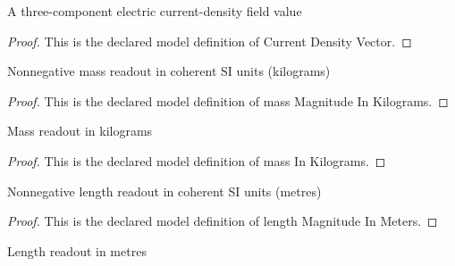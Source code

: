 \begin{definition}
  \label{def:physics:phyx-mini-0627:phyxminiproblems-problemphyxmini0627-currentdensityvector}
  A three-component electric current-density field value
\end{definition}
\begin{proof}
  This is the declared model definition of Current Density Vector.
\end{proof}
\begin{definition}
  \label{def:physics:phyx-mini-0627:phyxminiproblems-problemphyxmini0627-massmagnitudeinkilograms}
  Nonnegative mass readout in coherent SI units (kilograms)
\end{definition}
\begin{proof}
  This is the declared model definition of mass Magnitude In Kilograms.
\end{proof}
\begin{definition}
  \label{def:physics:phyx-mini-0627:phyxminiproblems-problemphyxmini0627-massinkilograms}
  Mass readout in kilograms
\end{definition}
\begin{proof}
  This is the declared model definition of mass In Kilograms.
\end{proof}
\begin{definition}
  \label{def:physics:phyx-mini-0627:phyxminiproblems-problemphyxmini0627-lengthmagnitudeinmeters}
  Nonnegative length readout in coherent SI units (metres)
\end{definition}
\begin{proof}
  This is the declared model definition of length Magnitude In Meters.
\end{proof}
\begin{definition}
  \label{def:physics:phyx-mini-0627:phyxminiproblems-problemphyxmini0627-lengthinmeters}
  Length readout in metres
\end{definition}
